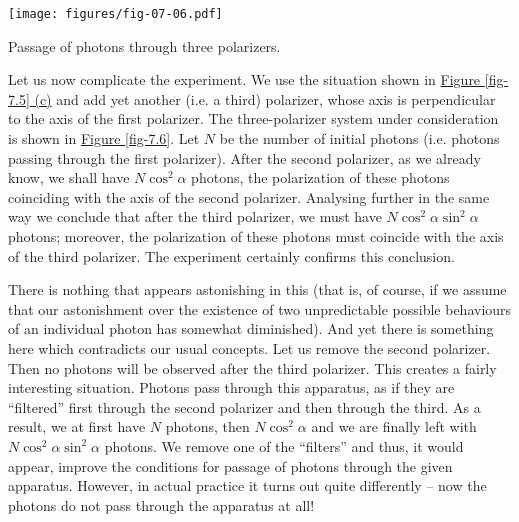 \documentclass[a4paper,sfsidenotes,colorlinks=true]{tufte-book}
\numberwithin{equation}{section}
\numberwithin{figure}{section}
\begin{document}
\begin{marginfigure}[1cm]
\centering
\texttt{[image: figures/fig-07-06.pdf]}
\caption{Passage of photons through three polarizers.}
\label{fig-7.6}
\end{marginfigure}

Let us now complicate the experiment. We use the situation shown in \hyperref[fig-7.5]{Figure \ref{fig-7.5} (c)} and add yet another (i.e. a third) polarizer, whose axis is perpendicular to the axis of the first polarizer. The three-polarizer system under consideration is shown in \hyperref[fig-7.6]{Figure \ref{fig-7.6}}. Let $N$ be the number of initial photons (i.e. photons passing through the first polarizer). After the second polarizer, as we already know, we shall have $N \cos^{2} \alpha$ photons, the polarization of these photons coinciding with the axis of the second polarizer. Analysing further in the same way	we conclude that after the third polarizer, we must have $N \cos^{2} \alpha \sin^{2} \alpha$ photons; moreover, the polarization of these photons must
coincide with the axis of the third polarizer. The experiment certainly confirms this conclusion. 


There is nothing that appears astonishing in this (that is, of course, if we assume that our astonishment over the existence of two unpredictable possible behaviours of an individual photon has somewhat diminished). And yet there is something here which contradicts our usual concepts. Let us remove the second polarizer. Then no photons will be observed after the third polarizer. This creates a fairly interesting situation. Photons pass through this apparatus, as if they are ``filtered'' first through the second polarizer and then through the third. As a result, we at first have $N$ photons, then $N \cos^{2} \alpha$	and we are finally left with $N \cos^{2} \alpha \sin^{2} \alpha$ photons. We remove one of the ``filters'' and thus, it would appear, improve the conditions for passage of photons through the given apparatus. However, in actual practice it turns out quite differently -- now the photons do not pass through the apparatus at all!
\end{document}
